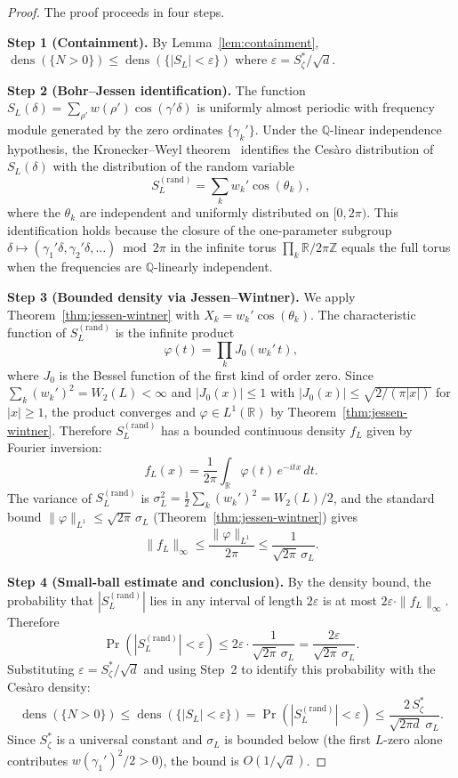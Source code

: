 \documentclass[12pt,reqno]{amsart}
\theoremstyle{plain}
\theoremstyle{definition}
\theoremstyle{remark}
\DeclareMathOperator{\dens}{dens}
\newcommand{\Q}{\mathbb{Q}}
\newcommand{\Z}{\mathbb{Z}}
\newcommand{\R}{\mathbb{R}}
\begin{document}
\begin{proof}
The proof proceeds in four steps.

\medskip\noindent\textbf{Step 1 (Containment).}
By Lemma~\ref{lem:containment}, $\dens(\{N > 0\}) \leq \dens(\{|S_L| < \varepsilon\})$ where $\varepsilon = S_\zeta^*/\sqrt{d}$.

\medskip\noindent\textbf{Step 2 (Bohr--Jessen identification).}
The function $S_{L}(\delta) = \sum_{\rho'} w(\rho')\cos(\gamma'\delta)$ is uniformly almost periodic with frequency module generated by the zero ordinates $\{\gamma_k'\}$. Under the $\Q$-linear independence hypothesis, the Kronecker--Weyl theorem~\cite[Chapter~1]{KuipersNiederreiter} identifies the Ces\`aro distribution of $S_{L}(\delta)$ with the distribution of the random variable
\[
S_{L}^{(\mathrm{rand})} = \sum_k w_k' \cos(\theta_k),
\]
where the $\theta_k$ are independent and uniformly distributed on $[0,2\pi)$. This identification holds because the closure of the one-parameter subgroup $\delta \mapsto (\gamma_1'\delta, \gamma_2'\delta, \ldots) \bmod 2\pi$ in the infinite torus $\prod_k \R/2\pi\Z$ equals the full torus when the frequencies are $\Q$-linearly independent.

\medskip\noindent\textbf{Step 3 (Bounded density via Jessen--Wintner).}
We apply Theorem~\ref{thm:jessen-wintner} with $X_k = w_k'\cos(\theta_k)$.
The characteristic function of $S_{L}^{(\mathrm{rand})}$ is the infinite product
\[
\varphi(t) = \prod_k J_0(w_k'\,t),
\]
where $J_0$ is the Bessel function of the first kind of order zero. Since $\sum_k (w_k')^2 = W_2(L) < \infty$ and $|J_0(x)| \leq 1$ with $|J_0(x)| \leq \sqrt{2/(\pi|x|)}$ for $|x| \geq 1$, the product converges and $\varphi \in L^1(\R)$ by Theorem~\ref{thm:jessen-wintner}. Therefore $S_{L}^{(\mathrm{rand})}$ has a bounded continuous density $f_L$ given by Fourier inversion:
\[
f_L(x) = \frac{1}{2\pi}\int_{\R}\varphi(t)\,e^{-itx}\,dt.
\]
The variance of $S_{L}^{(\mathrm{rand})}$ is $\sigma_{L}^2 = \frac{1}{2}\sum_k (w_k')^2 = W_2(L)/2$, and the standard bound $\|\varphi\|_{L^1} \leq \sqrt{2\pi}\,\sigma_L$ (Theorem~\ref{thm:jessen-wintner}) gives
\[
\|f_L\|_\infty \leq \frac{\|\varphi\|_{L^1}}{2\pi} \leq \frac{1}{\sqrt{2\pi}\,\sigma_{L}}.
\]

\medskip\noindent\textbf{Step 4 (Small-ball estimate and conclusion).}
By the density bound, the probability that $|S_{L}^{(\mathrm{rand})}|$ lies in any interval of length $2\varepsilon$ is at most $2\varepsilon \cdot \|f_L\|_\infty$. Therefore
\[
\Pr(|S_{L}^{(\mathrm{rand})}| < \varepsilon) \leq 2\varepsilon \cdot \frac{1}{\sqrt{2\pi}\,\sigma_{L}} = \frac{2\varepsilon}{\sqrt{2\pi}\,\sigma_{L}}.
\]
Substituting $\varepsilon = S_\zeta^*/\sqrt{d}$ and using Step~2 to identify this probability with the Ces\`aro density:
\[
\dens(\{N > 0\}) \leq \dens(\{|S_L| < \varepsilon\}) = \Pr(|S_{L}^{(\mathrm{rand})}| < \varepsilon) \leq \frac{2\,S_\zeta^*}{\sqrt{2\pi d}\;\sigma_{L}}.
\]
Since $S_\zeta^*$ is a universal constant and $\sigma_L$ is bounded below (the first $L$-zero alone contributes $w(\gamma_1')^2/2 > 0$), the bound is $O(1/\sqrt{d})$.
\end{proof}
\end{document}
